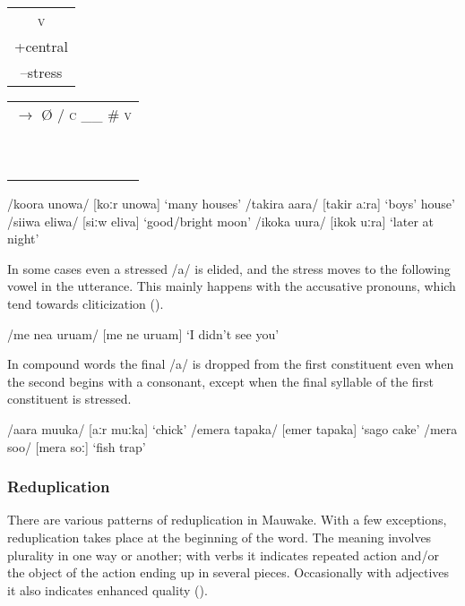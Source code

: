 \ea
\begin{tabular}{c}\textsc{v}\\+central\\--stress\\    \end{tabular}
\begin{tabular}{c}    $\rightarrow $ {\O}  /  \textsc{c} \_\_  \#  \textsc{v} \\~\\~\\    \end{tabular}
\z

\ea
\ea
/koora unowa/  [{{\textprimstress}koːr  u{{\textprimstress}}nowa}]  `many houses'
\ex
/takira {\textphi}aara/  [ta{{\textprimstress}kir  {{\textprimstress}}}{\textphi}aːra]  `boys' house'
\ex
/siiwa eliwa/  [{{\textprimstress}siːw  e{{\textprimstress}}liva}]  `good/bright moon'
\ex
/ikoka uura/  [i{{\textprimstress}kok  {{\textprimstress}}uːra}]  `later at night'
\z
\z

In some cases even a stressed /a/ is elided, and the stress moves to the following vowel in the utterance.  This mainly happens with the accusative pronouns, which tend towards cliticization ().

\ea
/me ne{\textphi}a uru{\textphi}am/  [{{\textprimstress}me ne}{\textphi} {{\textprimstress}uru}{\textphi}am]  `I didn't see you'
\z

In compound words the final /a/ is dropped from the first constituent even when the second begins with a consonant, except when the final syllable of the first constituent is stressed.  

\ea
\ea
/aara muuka/  [{{\textprimstress}aːr {{\textprimstress}}muːka}]  `chick'
\ex
/emera tapaka/  [e{{\textprimstress}mer ta{{\textprimstress}}paka}]  `sago cake'
\ex
/mera soo/  [me{{\textprimstress}ra {{\textprimstress}}soː}]  `fish trap'
\z
\z

\subsubsection{Reduplication}\label{sec:2:z:y:x}

There are various patterns of reduplication in Mauwake. With a few exceptions, reduplication takes place at the beginning of the word.  The meaning involves plurality in one way or another; with verbs it indicates repeated action and/or the object of the action ending up in several pieces. Occasionally with adjectives it also indicates enhanced quality ().

